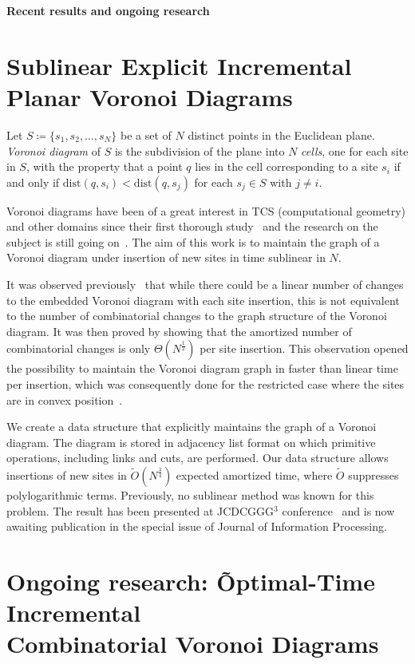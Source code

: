 \documentclass[a4paper,11pt]{article}
\def\vsection#1{\vspace{-4.5mm}\section{#1}\vspace{-3.5mm}}
\theoremstyle{definition}
\begin{document}
\def\P{\mathcal P} \def\Ot{\tilde O}

\begin{center}
	{\LARGE\bf Recent results and ongoing research}
\end{center} \vspace{-3.8mm}

\vsection{Sublinear Explicit Incremental Planar Voronoi Diagrams}

	Let $S \coloneqq \{s_1, s_2, \ldots, s_N\}$ be a set of $N$ distinct points in the Euclidean plane. \emph{Voronoi diagram} of $S$ is the subdivision of the plane into $N$ \emph{cells}, one for each site in $S$, with the property that a point $q$ lies in the cell corresponding to a site $s_i$ if and only if $\mathrm{dist} (q, s_i) < \mathrm{dist} (q, s_j)$ for each $s_j \in S$ with $j \ne i$.

Voronoi diagrams have been of a great interest in TCS (computational geometry) and other domains since their first thorough study~\cite{v-vd} and the research on the subject is still going on~\cite{vd-new}. The aim of this work is to maintain the graph of a Voronoi diagram under insertion of new sites in time sublinear in $N$.

It was observed previously~\cite{incremental-vd} that while there could be a linear number of changes to the embedded Voronoi diagram with each site insertion, this is not equivalent to the number of combinatorial changes to the graph structure of the Voronoi diagram. It was then proved by showing that the amortized number of combinatorial changes is only $\Theta(N^{\frac 12})$ per site insertion. This observation opened the possibility to maintain the Voronoi diagram graph in faster than linear time per insertion, which was consequently done for the restricted case where the sites are in convex position~\cite{incremental-vd}.

We create a data structure that explicitly maintains the graph of a Voronoi diagram. The diagram is stored in adjacency list format on which primitive operations, including links and cuts, are performed. Our data structure allows insertions of new sites in $\Ot (N^{\frac 34})$ expected amortized time, where $\Ot$ suppresses polylogarithmic terms. Previously, no sublinear method was known for this problem. The result has been presented at JCDCGGG$^3$ conference~\cite{sevd} and is now awaiting publication in the special issue of Journal of Information Processing.

\vsection{Ongoing research: \~Optimal-Time Incremental \\
	Combinatorial Voronoi Diagrams}
\end{document}
